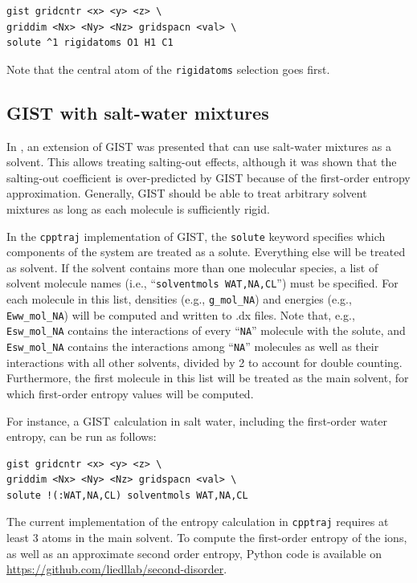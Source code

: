 \documentclass[9pt,tutorial]{livecoms}
\newcommand{\software}{\texttt}
\newcommand\inlinecode{\texttt}
\begin{document}
\begin{lstlisting}[style=cpptraj]
gist gridcntr <x> <y> <z> \
griddim <Nx> <Ny> <Nz> gridspacn <val> \
solute ^1 rigidatoms O1 H1 C1
\end{lstlisting}

Note that the central atom of the \inlinecode{rigidatoms} selection goes first.

\subsection{GIST with salt-water mixtures}
\label{sec-salt-water}
In \cite{Waibl2021-gist-salt}, an extension of GIST was presented that can use salt-water mixtures as a solvent.
This allows treating salting-out effects, although it was shown that the salting-out coefficient is over-predicted by GIST because of the first-order entropy approximation.
Generally, GIST should be able to treat arbitrary solvent mixtures as long as each molecule is sufficiently rigid.

In the \software{cpptraj} implementation of GIST, the \inlinecode{solute} keyword specifies which components of the system are treated as a solute.
Everything else will be treated as solvent.
If the solvent contains more than one molecular species, a list of solvent molecule names (i.e., ``\inlinecode{solventmols WAT,NA,CL}'') must be specified.
For each molecule in this list, densities (e.g., \inlinecode{g\_mol\_NA}) and energies (e.g., \inlinecode{Eww\_mol\_NA}) will be computed and written to .dx files.
Note that, e.g., \inlinecode{Esw\_mol\_NA} contains the interactions of every ``\inlinecode{NA}'' molecule with the solute, and \inlinecode{Esw\_mol\_NA} contains the interactions among ``\inlinecode{NA}'' molecules as well as their interactions with all other solvents, divided by 2 to account for double counting.
Furthermore, the first molecule in this list will be treated as the main solvent, for which first-order entropy values will be computed.

For instance, a GIST calculation in salt water, including the first-order water entropy, can be run as follows:

\begin{lstlisting}[style=cpptraj]
gist gridcntr <x> <y> <z> \
griddim <Nx> <Ny> <Nz> gridspacn <val> \
solute !(:WAT,NA,CL) solventmols WAT,NA,CL
\end{lstlisting}

The current implementation of the entropy calculation in \software{cpptraj} requires at least 3 atoms in the main solvent.
To compute the first-order entropy of the ions, as well as an approximate second order entropy, Python code is available on \url{https://github.com/liedllab/second-disorder}.
\end{document}
